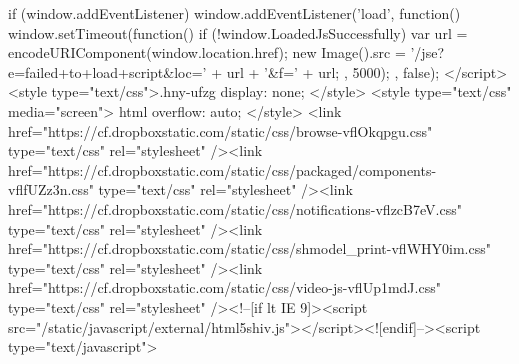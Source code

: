 {    if (window.addEventListener) {
        window.addEventListener('load', function() {
            window.setTimeout(function() {
                if (!window.LoadedJsSuccessfully) {
                    var url = encodeURIComponent(window.location.href);
                    new Image().src = '/jse?e=failed+to+load+script&loc=' + url + '&f=' + url;
                }
            }, 5000);
        }, false);
    }
</script><style type="text/css">.hny-ufzg { display: none; }</style> 
            <style type="text/css" media="screen">
                html {
                  overflow: auto;
                }
            </style>
        <link href="https://cf.dropboxstatic.com/static/css/browse-vflOkqpgu.css" type="text/css" rel="stylesheet" /><link href="https://cf.dropboxstatic.com/static/css/packaged/components-vflfUZz3n.css" type="text/css" rel="stylesheet" /><link href="https://cf.dropboxstatic.com/static/css/notifications-vflzcB7eV.css" type="text/css" rel="stylesheet" /><link href="https://cf.dropboxstatic.com/static/css/shmodel_print-vflWHY0im.css" type="text/css" rel="stylesheet" /><link href="https://cf.dropboxstatic.com/static/css/video-js-vflUp1mdJ.css" type="text/css" rel="stylesheet" /><!--[if lt IE 9]><script src="/static/javascript/external/html5shiv.js"></script><![endif]--><script type="text/javascript">
}
